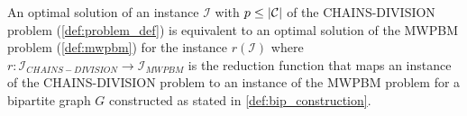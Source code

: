  

\begin{theorem}
    An optimal solution of an instance $\mathcal I$ with $p \leq |\mathcal{C}|$ of the \textsc{CHAINS-DIVISION} problem (\cref{def:problem_def}) is equivalent to an optimal solution of the \textsc{MWPBM} problem (\cref{def:mwpbm}) for the instance $r(\mathcal I)$ where $r: \mathcal{I}_{CHAINS-DIVISION} \rightarrow \mathcal{I}_{MWPBM}$ is the reduction function that maps an instance of the CHAINS-DIVISION problem to an instance of the MWPBM problem for a bipartite graph $G$ constructed as stated in \cref{def:bip_construction}.
\end{theorem}

